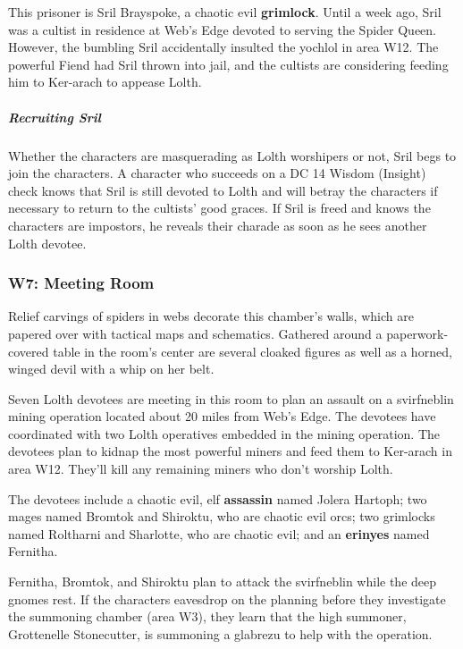 \documentclass[10pt,a4paper,twoside,bg=print,twocolumn,openany,nodeprecatedcode]{dndbook}
\begin{document}
This prisoner is Sril Brayspoke, a chaotic evil \textbf{grimlock}. Until a week ago, Sril was a cultist in residence at Web's Edge devoted to serving the Spider Queen. However, the bumbling Sril accidentally insulted the yochlol in area W12. The powerful Fiend had Sril thrown into jail, and the cultists are considering feeding him to Ker-arach to appease Lolth.

\subparagraph{Recruiting Sril}
Whether the characters are masquerading as Lolth worshipers or not, Sril begs to join the characters. A character who succeeds on a DC 14 Wisdom (Insight) check knows that Sril is still devoted to Lolth and will betray the characters if necessary to return to the cultists' good graces. If Sril is freed and knows the characters are impostors, he reveals their charade as soon as he sees another Lolth devotee.

\subsubsection{W7: Meeting Room}
\begin{DndReadAloud}{}
Relief carvings of spiders in webs decorate this chamber's walls, which are papered over with tactical maps and schematics. Gathered around a paperwork-covered table in the room's center are several cloaked figures as well as a horned, winged devil with a whip on her belt.

\end{DndReadAloud}

Seven Lolth devotees are meeting in this room to plan an assault on a svirfneblin mining operation located about 20 miles from Web's Edge. The devotees have coordinated with two Lolth operatives embedded in the mining operation. The devotees plan to kidnap the most powerful miners and feed them to Ker-arach in area W12. They'll kill any remaining miners who don't worship Lolth.

The devotees include a chaotic evil, elf \textbf{assassin} named Jolera Hartoph; two mages named Bromtok and Shiroktu, who are chaotic evil orcs; two grimlocks named Roltharni and Sharlotte, who are chaotic evil; and an \textbf{erinyes} named Fernitha.

Fernitha, Bromtok, and Shiroktu plan to attack the svirfneblin while the deep gnomes rest. If the characters eavesdrop on the planning before they investigate the summoning chamber (area W3), they learn that the high summoner, Grottenelle Stonecutter, is summoning a glabrezu to help with the operation.
\end{document}
